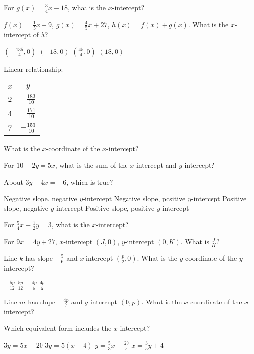 \documentclass[12pt]{exam}
\begin{document}
\begin{questions}
\question For $g(x) = \frac{3}{4}x - 18$, what is the $x$-intercept?

\question $f(x) = \frac{1}{5}x - 9$, $g(x) = \frac{4}{5}x + 27$, $h(x) = f(x) + g(x)$. What is the $x$-intercept of $h$?
\begin{choices}
\choice $(-\frac{135}{4}, 0)$
\choice $(-18, 0)$
\choice $(\frac{45}{4}, 0)$
\choice $(18, 0)$
\end{choices}

\question Linear relationship:
\begin{center}
\begin{tabular}{|c|c|}
\hline
$x$ & $y$ \\
\hline
2 & $-\frac{183}{10}$ \\
4 & $-\frac{171}{10}$ \\
7 & $-\frac{153}{10}$ \\
\hline
\end{tabular}
\end{center}
What is the $x$-coordinate of the $x$-intercept?

\question For $10 - 2y = 5x$, what is the sum of the $x$-intercept and $y$-intercept?

\question About $3y - 4x = -6$, which is true?
\begin{choices}
\choice Negative slope, negative $y$-intercept
\choice Negative slope, positive $y$-intercept
\choice Positive slope, negative $y$-intercept
\choice Positive slope, positive $y$-intercept
\end{choices}

\question For $\frac{5}{4}x + \frac{1}{2}y = 3$, what is the $x$-intercept?

\question For $9x = 4y + 27$, $x$-intercept $(J,0)$, $y$-intercept $(0,K)$. What is $\frac{J}{K}$?

\question Line $k$ has slope $-\frac{5}{6}$ and $x$-intercept $(\frac{p}{2}, 0)$. What is the $y$-coordinate of the $y$-intercept?
\begin{choices}
\choice $-\frac{5p}{12}$
\choice $\frac{5p}{12}$
\choice $-\frac{4p}{5}$
\choice $\frac{4p}{5}$
\end{choices}

\question Line $m$ has slope $-\frac{4p}{7}$ and $y$-intercept $(0,p)$. What is the $x$-coordinate of the $x$-intercept?

\question Which equivalent form includes the $x$-intercept?
\begin{choices}
\choice $3y = 5x - 20$
\choice $3y = 5(x - 4)$
\choice $y = \frac{5}{3}x - \frac{20}{3}$
\choice $x = \frac{3}{5}y + 4$
\end{choices}


\end{questions}
\end{document}
